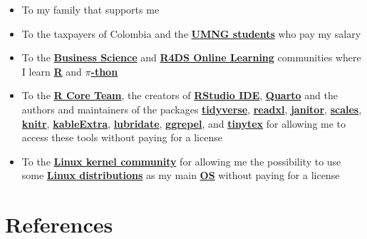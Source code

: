 \documentclass[
  ignorenonframetext,
]{beamer}
\begin{document}
\begin{frame}{}
\label{section-18}
\begin{itemize}
\item
  To my family that supports me
\item
  To the taxpayers of Colombia and the
  \textbf{\href{https://www.umng.edu.co/estudiante}{UMNG students}} who
  pay my salary
\item
  To the \textbf{\href{https://www.business-science.io/}{Business
  Science}} and \textbf{\href{https://www.rfordatasci.com/}{R4DS Online
  Learning}} communities where I learn
  \textbf{\href{https://www.r-project.org/about.html}{R}} and
  \textbf{\href{https://www.python.org/about/}{\(\pi\)-thon}}
\item
  To the \textbf{\href{https://www.r-project.org/contributors.html}{R
  Core Team}}, the creators of
  \textbf{\href{https://rstudio.com/products/rstudio/}{RStudio IDE}},
  \textbf{\href{https://quarto.org/}{Quarto}} and the authors and
  maintainers of the packages
  \textbf{\href{https://CRAN.R-project.org/package=tidyverse}{tidyverse}},
  \textbf{\href{https://CRAN.R-project.org/package=readxl}{readxl}},
  \textbf{\href{https://CRAN.R-project.org/package=janitor}{janitor}},
  \textbf{\href{https://CRAN.R-project.org/package=scales}{scales}},
  \textbf{\href{https://CRAN.R-project.org/package=knitr}{knitr}},
  \textbf{\href{https://CRAN.R-project.org/package=kableExtra}{kableExtra}},
  \textbf{\href{https://CRAN.R-project.org/package=lubridate}{lubridate}},
  \textbf{\href{https://CRAN.R-project.org/package=ggrepel}{ggrepel}},
  and
  \textbf{\href{https://CRAN.R-project.org/package=tinytex}{tinytex}}
  for allowing me to access these tools without paying for a license
\item
  To the \textbf{\href{https://www.kernel.org/category/about.html}{Linux
  kernel community}} for allowing me the possibility to use some
  \textbf{\href{https://static.lwn.net/Distributions/}{Linux
  distributions}} as my main
  \textbf{\href{https://en.wikipedia.org/wiki/Operating_system}{OS}}
  without paying for a license
\end{itemize}
\end{frame}

\section*{References}\label{references}
\end{document}
